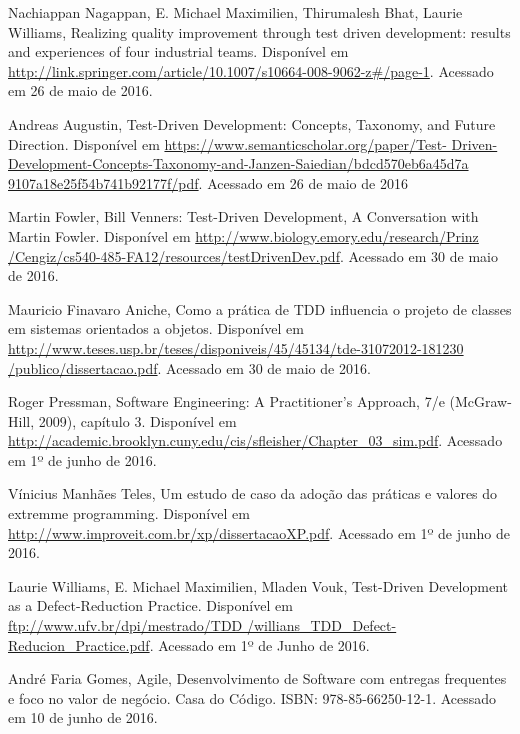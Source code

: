 \documentclass[12pt]{article}
\begin{document}
  \begin{flushleft}
  Nachiappan Nagappan, E. Michael Maximilien, Thirumalesh Bhat,
  Laurie Williams, Realizing quality improvement through test driven 
  development: results and experiences of four industrial teams. Disponível em
  \url{http://link.springer.com/article/10.1007/s10664-008-9062-z#/page-1}.
  Acessado em 26 de maio de 2016.

  Andreas Augustin, Test-Driven Development: Concepts, Taxonomy, and Future 
  Direction. Disponível em \url{https://www.semanticscholar.org/paper/Test-
  Driven-Development-Concepts-Taxonomy-and-Janzen-Saiedian/bdcd570eb6a45d7a
  9107a18e25f54b741b92177f/pdf}. Acessado em 26 de maio de 2016

  Martin Fowler, Bill Venners: Test-Driven Development, A Conversation with 
  Martin Fowler. Disponível em \url{http://www.biology.emory.edu/research/Prinz
  /Cengiz/cs540-485-FA12/resources/testDrivenDev.pdf}. Acessado em 30 de maio de
  2016.

  Mauricio Finavaro Aniche, Como a prática de TDD influencia o projeto de 
  classes em sistemas orientados a objetos. Disponível em 
  \url{http://www.teses.usp.br/teses/disponiveis/45/45134/tde-31072012-181230
  /publico/dissertacao.pdf}. Acessado em 30 de maio de 2016.

  Roger Pressman, Software Engineering: A Practitioner’s Approach, 7/e 
  (McGraw-Hill, 2009), capítulo 3.  Disponível em
  \url{http://academic.brooklyn.cuny.edu/cis/sfleisher/Chapter_03_sim.pdf}.
  Acessado em 1º de junho de 2016.

  Vínicius Manhães Teles, Um estudo de caso da adoção das práticas e valores do
  extremme programming. Disponível em
  \url{http://www.improveit.com.br/xp/dissertacaoXP.pdf}. Acessado em 1º de 
  junho de 2016.

  Laurie Williams, E. Michael Maximilien, Mladen Vouk, Test-Driven Development 
  as a Defect-Reduction Practice. Disponível em 
  \url{ftp://www.ufv.br/dpi/mestrado/TDD
  /willians_TDD_Defect-Reducion_Practice.pdf}. Acessado em 1º de Junho de 2016.

  André Faria Gomes, Agile, Desenvolvimento de Software com entregas frequentes
  e foco no valor de negócio. Casa do Código. ISBN: 978-85-66250-12-1. Acessado
  em 10 de junho de 2016.
  
  \end{flushleft}
\end{document}

